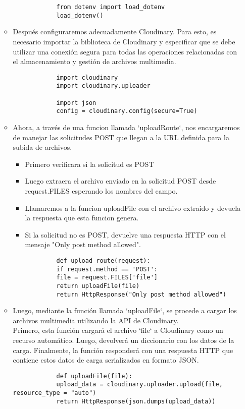 \begin{enumerate}
\begin{itemize}
\begin{verbatim}
			from dotenv import load_dotenv
			load_dotenv()
		\end{verbatim}
		\item Después configuraremos adecuadamente Cloudinary. Para esto, es necesario importar la biblioteca de Cloudinary y especificar que se debe utilizar una conexión segura para todas las operaciones relacionadas con el almacenamiento y gestión de archivos multimedia.
		\begin{verbatim}
			import cloudinary
			import cloudinary.uploader
			
			import json
			config = cloudinary.config(secure=True)
		\end{verbatim}
		\item Ahora, a través de una funcion llamada `uploadRoute`, nos encargaremos de manejar las solicitudes POST que llegan a la URL definida para la subida de archivos.
		\begin{itemize}
			\item Primero verificara si la solicitud es POST
			\item Luego extraera el archivo enviado en la solicitud POST desde request.FILES esperando los nombres del campo.
			\item Llamaremos a la funcion uploadFile con el archivo extraido y devuela la respuesta que esta funcion genera.
			\item Si la solicitud no es POST, devuelve una respuesta HTTP con el mensaje "Only post method allowed".
		\end{itemize}
		\begin{verbatim}
			def upload_route(request):
			if request.method == 'POST':
			file = request.FILES['file']
			return uploadFile(file)
			return HttpResponse("Only post method allowed")
		\end{verbatim}
		\item Luego, mediante la función llamada `uploadFile`, se procede a cargar los archivos multimedia utilizando la API de Cloudinary. \\
		Primero, esta función cargará el archivo `file` a Cloudinary como un recurso automático. Luego, devolverá un diccionario con los datos de la carga. Finalmente, la función responderá con una respuesta HTTP que contiene estos datos de carga serializados en formato JSON.
		\begin{verbatim}
			def uploadFile(file):
			upload_data = cloudinary.uploader.upload(file, resource_type = "auto")
			return HttpResponse(json.dumps(upload_data))
		\end{verbatim}
	\end{itemize}			
\end{enumerate}